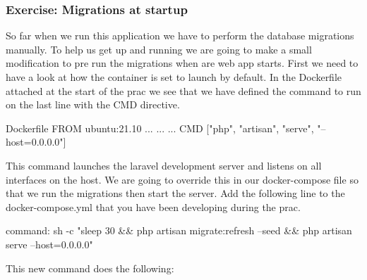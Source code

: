 \documentclass{csse4400}
\begin{document}

\subsubsection{Exercise: Migrations at startup}

So far when we run this application we have to perform the database migrations manually. To help us get up and running
we are going to make a small modification to pre run the migrations when are web app starts. First we need to have a look
at how the container is set to launch by default. In the Dockerfile attached at the start of the prac we see that we have
defined the command to run on the last line with the CMD directive.

\begin{code}[language=docker]{Dockerfile}
  FROM ubuntu:21.10
  ... 
  ... 
  ...
  CMD ["php", "artisan", "serve", "--host=0.0.0.0"]
\end{code}


This command launches the laravel development server and listens on all interfaces on the host. We are going to override
this in our docker-compose file so that we run the migrations then start the server. Add the following line to the 
docker-compose.yml that you have been developing during the prac.

\begin{code}[language=docker-compose]{}
  command: sh -c "sleep 30 && php artisan migrate:refresh --seed && php artisan serve --host=0.0.0.0"
\end{code}

This new command does the following:
\end{document}
